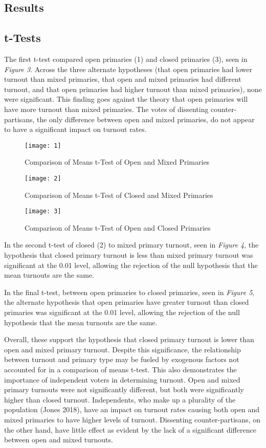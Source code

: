 \documentclass[12pt]{article}
\begin{document}
\begin{doublespace}
	\section{Results}
	\subsection*{t-Tests}
	The first t-test compared open primaries (1) and closed primaries (3), seen in \textit{Figure 3}. Across the three alternate hypotheses (that open primaries had lower turnout than mixed primaries, that open and mixed primaries had different turnout, and that open primaries had higher turnout than mixed primaries), none were significant. This finding goes against the theory that open primaries will have more turnout than mixed primaries. The votes of dissenting counter-partisans, the only difference between open and mixed primaries, do not appear to have a significant impact on turnout rates. \par
	\begin{figure}[h]
		\texttt{[image: 1]}
		\caption{Comparison of Means t-Test of Open and Mixed Primaries}
		\label{fig:figure4}
	\end{figure}
	\begin{figure}[h]
		\texttt{[image: 2]}
		\caption{Comparison of Means t-Test of Closed and Mixed Primaries}
		\label{fig:figure5}
	\end{figure}
	\begin{figure}[H]
		\texttt{[image: 3]}
		\caption{Comparison of Means t-Test of Open and Closed Primaries}
		\label{fig:figure6}
	\end{figure}
	In the second t-test of closed (2) to mixed primary turnout, seen in \textit{Figure 4}, the hypothesis that closed primary turnout is less than mixed primary turnout was significant at the 0.01 level, allowing the rejection of the null hypothesis that the mean turnouts are the same. \par
	In the final t-test, between open primaries to closed primaries, seen in \textit{Figure 5}, the alternate hypothesis that open primaries have greater turnout than closed primaries was significant at the 0.01 level, allowing the rejection of the null hypothesis that the mean turnouts are the same. \par
	Overall, these support the hypothesis that closed primary turnout is lower than open and mixed primary turnout. Despite this significance, the relationship between turnout and primary type may be fueled by exogenous factors not accounted for in a comparison of means t-test. This also demonstrates the importance of independent voters in determining turnout. Open and mixed primary turnouts were not significantly different, but both were significantly higher than closed turnout. Independents, who make up a plurality of the population (Jones 2018),  have an impact on turnout rates causing both open and mixed primaries to have higher levels of turnout. Dissenting counter-partisans, on the other hand, have little effect as evident by the lack of a significant difference between open and mixed turnouts. \par

\end{doublespace}
\end{document}
